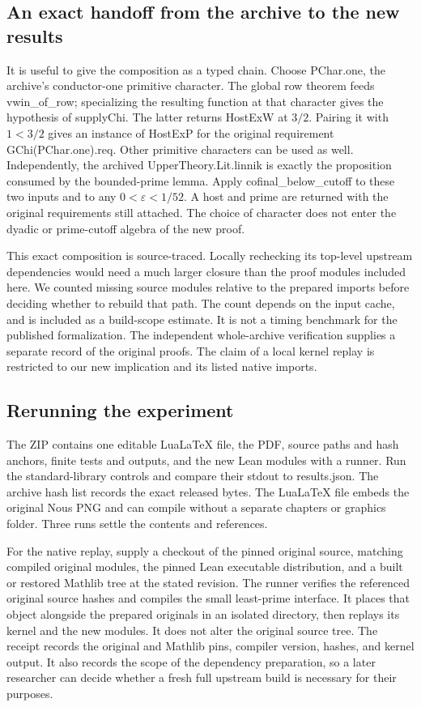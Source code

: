 \documentclass[12pt,letterpaper]{article}
\DeclareRobustCommand{\id}[1]{\mbox{\small\ttfamily #1}}
\begin{document}
\subsection{An exact handoff from the archive to the new results}

It is useful to give the composition as a typed chain. Choose \id{PChar.one}, the archive's conductor-one primitive character. The global row theorem feeds \id{vwin\_of\_row}; specializing the resulting function at that character gives the hypothesis of \id{supplyChi}. The latter returns \id{HostExW} at \(3/2\). Pairing it with \(1<3/2\) gives an instance of \id{HostExP} for the original requirement \id{GChi(PChar.one).req}. Other primitive characters can be used as well. Independently, the archived \id{UpperTheory.Lit.linnik} is exactly the proposition consumed by the bounded-prime lemma. Apply \id{cofinal\_below\_cutoff} to these two inputs and to any \(0<\varepsilon<1/52\). A host and prime are returned with the original requirements still attached. The choice of character does not enter the dyadic or prime-cutoff algebra of the new proof.

This exact composition is source-traced. Locally rechecking its top-level upstream dependencies would need a much larger closure than the proof modules included here. We counted missing source modules relative to the prepared imports before deciding whether to rebuild that path. The count depends on the input cache, and is included as a build-scope estimate. It is not a timing benchmark for the published formalization. The independent whole-archive verification supplies a separate record of the original proofs. The claim of a local kernel replay is restricted to our new implication and its listed native imports.

\subsection{Rerunning the experiment}

The ZIP contains one editable LuaLaTeX file, the PDF, source paths and hash anchors, finite tests and outputs, and the new Lean modules with a runner. Run the standard-library controls and compare their stdout to \id{results.json}. The archive hash list records the exact released bytes. The LuaLaTeX file embeds the original Nous PNG and can compile without a separate chapters or graphics folder. Three runs settle the contents and references.

For the native replay, supply a checkout of the pinned original source, matching compiled original modules, the pinned Lean executable distribution, and a built or restored Mathlib tree at the stated revision. The runner verifies the referenced original source hashes and compiles the small least-prime interface. It places that object alongside the prepared originals in an isolated directory, then replays its kernel and the new modules. It does not alter the original source tree. The receipt records the original and Mathlib pins, compiler version, hashes, and kernel output. It also records the scope of the dependency preparation, so a later researcher can decide whether a fresh full upstream build is necessary for their purposes.
\end{document}
